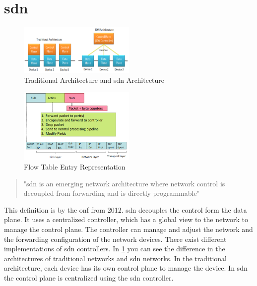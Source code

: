 \documentclass[conference]{IEEEtran}
\begin{document}
	\section{\ac{sdn}}
	\label{sec:sdn}

	\begin{figure}
		\centering
		\includegraphics[width=0.5\textwidth]{figures/architecture-compare.png}
		\caption{Traditional Architecture and \ac{sdn} Architecture \cite{Jefia2018-pj}}
		\label{fig:architecture-compare}
	\end{figure}

	\begin{figure}
		\centering
		\includegraphics[width=0.5\textwidth]{figures/flow-table.png}
		\caption{Flow Table Entry Representation \cite{nunez2023briefoverviewsoftwaredefinednetworking}}
		\label{fig:flow-table}
	\end{figure}

	\begin{quote}
		"\acf{sdn} is an emerging network architecture
		where network control is decoupled from forwarding and is directly programmable" \cite{sdn-onf} 
	\end{quote}

	This definition is by the \ac{onf} from 2012. \acf{sdn} decouples the control form the data plane. It uses a centralized controller, which has a global view to the network to manage the control plane. The controller can manage and adjust the network and the forwarding configuration of the network devices. There exist different implementations of \ac{sdn} controllers. In \ref{fig:architecture-compare} you can see the difference in the architectures of traditional networks and \ac{sdn} networks. In the traditional architecture, each device has its own control plane to manage the device. In \ac{sdn} the control plane is centralized using the \ac{sdn} controller.
\end{document}
